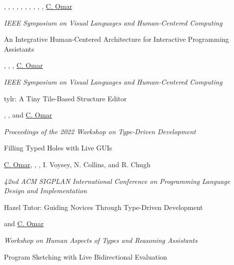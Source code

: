 \documentclass[10pt,letterpaper]{article}
\renewenvironment{itemize}{
  \begin{list}{}{
    \setlength{\leftmargin}{1.25em}
    \setlength{\itemsep}{0.25em}
    \setlength{\parskip}{0pt}
    \setlength{\parsep}{0.2em}
  }
}{
  \end{list}
}
\begin{document}
\begin{enumerate}[leftmargin=*, labelindent=6.5em, font=\bfseries]
\begin{itemize}
          \item {}, , , , , , , , , , \underline{C. Omar}
          \item \textit{IEEE Symposium on Visual Languages and Human-Centered Computing}
        \end{itemize}
  \item[VL/HCC 2022] {An Integrative Human-Centered Architecture for Interactive Programming Assistants}
        \begin{itemize}
          \item {}, , , \underline{C. Omar}
          \item \textit{IEEE Symposium on Visual Languages and Human-Centered Computing} 
        \end{itemize}
  \item[TyDe 2022] {tylr: A Tiny Tile-Based Structure Editor}
        \begin{itemize} 
          \item {}, , and \underline{C. Omar}
          \item \textit{Proceedings of the 2022 Workshop on Type-Driven Development}
        \end{itemize}
  \item[PLDI 2021] {Filling Typed Holes with Live GUIs}
        \begin{itemize}
          \item \underline{C. Omar}, , , I. Voysey, N. Collins, and R. Chugh
          \item \textit{42nd ACM SIGPLAN International Conference on Programming Language Design and Implementation}
        \end{itemize}
  \item[HATRA 2020] Hazel Tutor: Guiding Novices Through Type-Driven Development
        \begin{itemize}
          \item {} and \underline{C. Omar}
          \item \textit{Workshop on Human Aspects of Types and Reasoning Assistants}
        \end{itemize}
  \item[ICFP 2020] {Program Sketching with Live Bidirectional Evaluation}
        \begin{itemize}

\end{itemize}
\end{enumerate}
\end{document}
